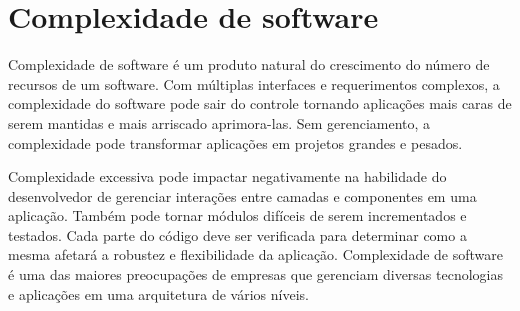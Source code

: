 %
%
%
%
%

\section{Complexidade de software}

Complexidade de software é um produto natural do crescimento do número de recursos de um software. Com múltiplas interfaces e requerimentos complexos, a complexidade do software pode sair do controle tornando aplicações mais caras de serem mantidas e mais arriscado aprimora-las. Sem gerenciamento, a complexidade pode transformar aplicações em projetos grandes e pesados.

Complexidade excessiva pode impactar negativamente na habilidade do desenvolvedor de gerenciar interações entre camadas e componentes em uma aplicação. Também pode tornar módulos difíceis de serem incrementados e testados. Cada parte do código deve ser verificada para determinar como a mesma afetará a robustez e flexibilidade da aplicação. Complexidade de software é uma das maiores preocupações de empresas que gerenciam diversas tecnologias e aplicações em uma arquitetura de vários níveis.

